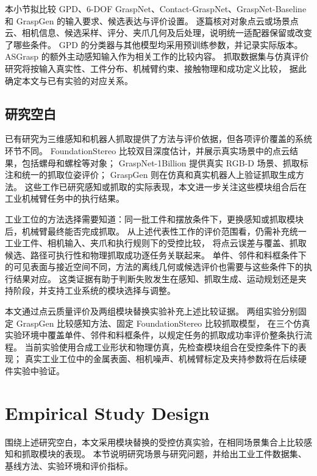 \documentclass[UTF8,fontset=fandol,a4paper,11pt]{ctexart}
\newcommand{\qyb}[1]{\textcolor{red!75!black}{#1}}
\begin{document}
本小节拟比较 GPD、6-DOF GraspNet、Contact-GraspNet、GraspNet-Baseline 和 GraspGen 的输入要求、候选表达与评价设置。
逐篇核对对象点云或场景点云、相机信息、候选采样、评分、夹爪几何及后处理，说明统一适配器保留或改变了哪些条件。
GPD 的分类器与其他模型均采用预训练参数，并记录实际版本。
ASGrasp 的额外主动感知输入作为相关工作的比较内容。
抓取数据集与仿真评价研究将按输入真实性、工件分布、机械臂约束、接触物理和成功定义比较，
据此确定本文与已有实验的对应关系。

\subsection{\qyb{研究空白}}
\label{sec:research-gap}

已有研究为三维感知和机器人抓取提供了方法与评价依据，但各项评价覆盖的系统环节不同。
FoundationStereo 比较双目深度估计，并展示真实场景中的点云结果，包括螺母和螺栓等对象\cite{wen2025}；
GraspNet-1Billion 提供真实 RGB-D 场景、抓取标注和统一的抓取位姿评价\cite{fang2020}；
GraspGen 则在仿真和真实机器人上验证抓取生成方法\cite{murali2026}。
这些工作已研究感知或抓取的实际表现，本文进一步关注这些模块组合后在工业机械臂任务中的执行结果。

工业工位的方法选择需要知道：同一批工件和摆放条件下，更换感知或抓取模块后，机械臂最终能否完成抓取。
从上述代表性工作的评价范围看，仍需补充统一工业工件、相机输入、夹爪和执行规则下的受控比较，
将点云误差与覆盖、抓取候选、路径可执行性和物理抓取成功逐任务关联起来。
单件、邻件和料框条件下的可见表面与接近空间不同，方法的离线几何或候选评价也需要与这些条件下的执行结果对应。
这类证据有助于判断失败发生在感知、抓取生成、运动规划还是夹持阶段，并支持工业系统的模块选择与调整。

本文通过点云质量评价及两组模块替换实验补充上述比较证据。
两组实验分别固定 GraspGen 比较感知方法、固定 FoundationStereo 比较抓取模型，
在三个仿真实验环境中覆盖单件、邻件和料框条件，以规定任务的抓取成功率评价整条执行流程。
当前实验使用合成工业形状和物理仿真，先检查模块组合在受控条件下的表现；
真实工业工位中的金属表面、相机噪声、机械臂标定及夹持参数将在后续硬件实验中验证。

\section{\qyb{Empirical Study Design}}
\label{sec:design}

围绕上述研究空白，本文采用模块替换的受控仿真实验，在相同场景集合上比较感知和抓取模块的表现。
本节说明研究场景与研究问题，并给出工业工件数据集、基线方法、实验环境和评价指标。
\end{document}
